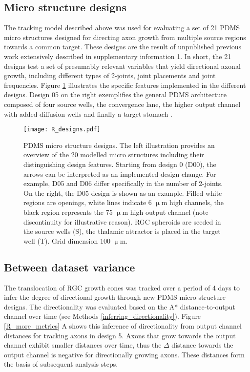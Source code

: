 \subsection{Micro structure designs}
The tracking model described above was used for evaluating a set of 21 PDMS
micro structures designed for directing axon growth from multiple source regions
towards a common target. These designs are the result of unpublished previous
work extensively described in supplementary information 1. In short, the 21
designs test a set of presumably relevant variables that yield directional
axonal growth, including different types of 2-joints, joint placements and joint
frequencies. Figure \ref{R_designs} illustrates the specific features
implemented in the different designs. Design 05 on the right exemplifies the
general PDMS architecture composed of four source wells, the convergence lane,
the higher output channel with added diffusion wells and finally a target
stomach \parencite{forro}. 

\begin{figure}[h!]
    \texttt{[image: R\_designs.pdf]}
    \caption[PDMS micro structure designs]
        {PDMS micro structure designs. The left illustration provides an
        overview of the 20 modelled micro structures including their
        distinguishing design features. Starting from design 0 (D00), the arrows
        can be interpreted as an implemented design change. For example, D05 and
        D06 differ specifically in the number of 2-joints. On the right, the D05
        design is shown as an example. Filled white regions are openings, white
        lines indicate 6 $\upmu$m high channels, the black region represents the
        75 $\upmu$m high output channel (note discontinuity for illustrative
        reason). RGC spheroids are seeded in the source wells (S), the thalamic
        attractor is placed in the target well (T). Grid dimension 100
        $\upmu$m.} 
    \label{R_designs}
\end{figure}


\subsection{Between dataset variance}
The translocation of RGC growth cones was tracked over a period of 4 days to
infer the degree of directional growth through new PDMS micro structure designs.
The directionality was evaluated based on the A* distance-to-output channel over
time (see Methods \ref{inferring_directionality}). Figure \ref{R_more_metrics} A
shows this inference of directionality from output channel distances for
tracking axons in design 5. Axons that grow towards the output channel exhibit
smaller distances over time, thus the $\Delta$ distance towards the output
channel is negative for directionally growing axons. These distances form the 
basis of subsequent analysis steps.\\

